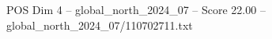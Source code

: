 \begin{textsample}{POS Dim 4 – global\_north\_2024\_07 – Score 22.00 – global\_north\_2024\_07/110702711.txt}
\end{textsample}
